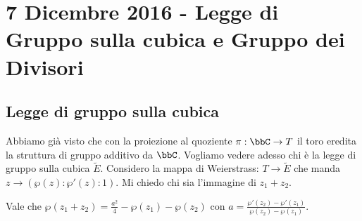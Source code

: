 \chapter{7 Dicembre 2016 - Legge di Gruppo sulla cubica e Gruppo dei Divisori}
\justify

\section{Legge di gruppo sulla cubica}
Abbiamo già visto che con la proiezione al quoziente $\pi : \bbC \rightarrow T$ il toro eredita la struttura di gruppo additivo da $\bbC$.
Vogliamo vedere adesso chi è la legge di gruppo sulla cubica $\widetilde{E}$.
Considero la mappa di Weierstrass: $T\rightarrow \widetilde{E}$ che manda $z \rightarrow (\wp(z):\wp'(z):1)$. Mi chiedo chi sia l'immagine di $z_1 + z_2$.

\begin{teorema}
  \label{leggedigruppo}
  Vale che $\wp(z_1+z_2) = \frac{a^2}{4} - \wp(z_1) - \wp(z_2) $
  con $a = \frac{\wp'(z_2) - \wp'(z_1)}{\wp(z_2) - \wp(z_1)}$.
\end{teorema}

